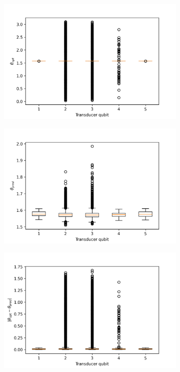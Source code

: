 \begin{figure}
	\centering
	\begin{subfigure}{0.32\textwidth}
		\centering
		\includegraphics[width=\textwidth]{img/theta_opt_box_dt_1}
	\end{subfigure}
	\begin{subfigure}{0.32\textwidth}
		\centering
		\includegraphics[width=\textwidth]{img/theta_pred_box_dt_1}
	\end{subfigure}
	\begin{subfigure}{0.32\textwidth}
		\centering
		\includegraphics[width=\textwidth]{img/delta_theta_box_dt_1}

\end{subfigure}
\end{figure}
